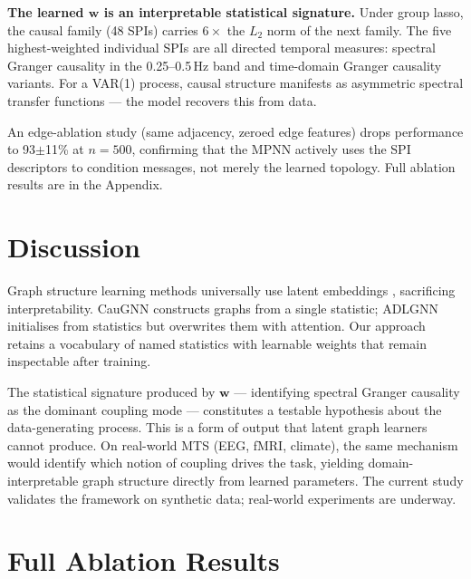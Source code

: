 \documentclass{article}
\theoremstyle{plain}
\begin{document}
\textbf{The learned $\mathbf{w}$ is an interpretable statistical signature.} Under group lasso, the causal family (48 SPIs) carries $6\times$ the $L_2$ norm of the next family. The five highest-weighted individual SPIs are all directed temporal measures: spectral Granger causality in the 0.25--0.5\,Hz band and time-domain Granger causality variants. For a VAR(1) process, causal structure manifests as asymmetric spectral transfer functions --- the model recovers this from data.

An edge-ablation study (same adjacency, zeroed edge features) drops performance to 93$\pm$11\% at $n{=}500$, confirming that the MPNN actively uses the SPI descriptors to condition messages, not merely the learned topology. Full ablation results are in the Appendix.

\section{Discussion}
\label{sec:discussion}

Graph structure learning methods universally use latent embeddings \citep{zhu2021}, sacrificing interpretability. CauGNN \citep{duan2023} constructs graphs from a single statistic; ADLGNN \citep{sriramulu2023} initialises from statistics but overwrites them with attention. Our approach retains a vocabulary of named statistics with learnable weights that remain inspectable after training.

The statistical signature produced by $\mathbf{w}$ --- identifying spectral Granger causality as the dominant coupling mode --- constitutes a testable hypothesis about the data-generating process. This is a form of output that latent graph learners cannot produce. On real-world MTS (EEG, fMRI, climate), the same mechanism would identify which notion of coupling drives the task, yielding domain-interpretable graph structure directly from learned parameters. The current study validates the framework on synthetic data; real-world experiments are underway.




\newpage
\appendix
\onecolumn
\section{Full Ablation Results}
\label{app:ablation}
\end{document}
